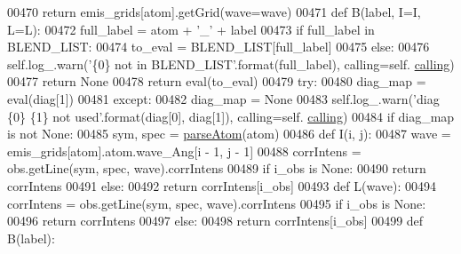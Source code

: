 \begin{DoxyCode}
00470                 \textcolor{keywordflow}{return} emis\_grids[atom].getGrid(wave=wave)
00471             \textcolor{keyword}{def }B(label, I=I, L=L):
00472                 full\_label = atom + \textcolor{stringliteral}{'\_'} + label
00473                 \textcolor{keywordflow}{if} full\_label \textcolor{keywordflow}{in} BLEND\_LIST:
00474                     to\_eval = BLEND\_LIST[full\_label]
00475                 \textcolor{keywordflow}{else}:
00476                     self.log\_.warn(\textcolor{stringliteral}{'\{0\} not in BLEND\_LIST'}.format(full\_label), calling=self.
      \hyperlink{classpyneb_1_1core_1_1diags_1_1_diagnostics_a07dce673fec8b2383ef411ab94b0b2fe}{calling})
00477                     \textcolor{keywordflow}{return} \textcolor{keywordtype}{None}
00478                 \textcolor{keywordflow}{return} eval(to\_eval)
00479             \textcolor{keywordflow}{try}:
00480                 diag\_map = eval(diag[1])
00481             \textcolor{keywordflow}{except}:
00482                 diag\_map = \textcolor{keywordtype}{None}
00483                 self.log\_.warn(\textcolor{stringliteral}{'diag \{0\} \{1\} not used'}.format(diag[0], diag[1]), calling=self.
      \hyperlink{classpyneb_1_1core_1_1diags_1_1_diagnostics_a07dce673fec8b2383ef411ab94b0b2fe}{calling})
00484             \textcolor{keywordflow}{if} diag\_map \textcolor{keywordflow}{is} \textcolor{keywordflow}{not} \textcolor{keywordtype}{None}:
00485                 sym, spec = \hyperlink{namespacepyneb_1_1utils_1_1misc_a2bb6f906a75f26a882093e9ce9272507}{parseAtom}(atom)
00486                 \textcolor{keyword}{def }I(i, j):
00487                     wave = emis\_grids[atom].atom.wave\_Ang[i - 1, j - 1]
00488                     corrIntens = obs.getLine(sym, spec, wave).corrIntens
00489                     \textcolor{keywordflow}{if} i\_obs \textcolor{keywordflow}{is} \textcolor{keywordtype}{None}:
00490                         \textcolor{keywordflow}{return} corrIntens
00491                     \textcolor{keywordflow}{else}:
00492                         \textcolor{keywordflow}{return} corrIntens[i\_obs]
00493                 \textcolor{keyword}{def }L(wave):
00494                     corrIntens = obs.getLine(sym, spec, wave).corrIntens
00495                     \textcolor{keywordflow}{if} i\_obs \textcolor{keywordflow}{is} \textcolor{keywordtype}{None}:
00496                         \textcolor{keywordflow}{return} corrIntens
00497                     \textcolor{keywordflow}{else}:
00498                         \textcolor{keywordflow}{return} corrIntens[i\_obs]
00499                 \textcolor{keyword}{def }B(label):

\end{DoxyCode}
